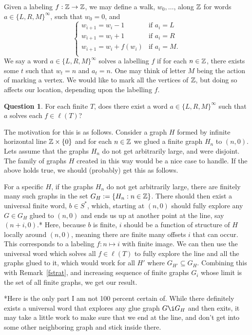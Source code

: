 \documentclass[a4paper]{article}
\theoremstyle{definition}
\newtheorem*{que}{Question}
\begin{document}
Given a labeling $f: \Bbb{Z}\to \Bbb{Z}$, we may define a walk, $w_0,\dots $, along $\Bbb{Z}$ for words $a \in \{L,R,M\}^\infty$, such that $w_0 =0$, and \[\begin{cases}w_{i+1} = w_i -1& \text{if } a_i = L\\ w_{i+1} = w_i +1& \text{if } a_i = R\\w_{i+1} = w_i +f(w_i)& \text{if } a_i = M.\\\end{cases}\]We say a word $a \in \{L,R,M\}^\infty$ solves a labelling $f$ if for each $n \in \Bbb{Z}$, there exists some $t$ such that $w_t = n$ and $a_t = n$. One may think of letter $M$ being the action of marking a vertex. We would like to mark all the vertices of $\Bbb{Z}$, but doing so affects our location, depending upon the labelling $f$.

\begin{que}
    For each finite $T$, does there exist a word $a \in \{L,R,M\}^\infty$ such that $a$ solves each $f \in \ell(T)$?
\end{que}

The motivation for this is as follows. Consider a graph $H$ formed by infinite horizontal line $\Bbb{Z}\times \{0\}$ and for each $n\in \Bbb{Z}$ we glued a finite graph $H_n$ to $(n,0)$. Lets assume that the graphs $H_n$ do not get arbitrarily large, and were disjoint. The family of graphs $H$ created in this way would be a nice case to handle. If the above holds true, we should (probably) get this as follows. 

For a specific $H$, if the graphs $H_n$ do not get arbitrarily large, there are finitely many such graphs in the set $G_H :=\{H_n:n \in \Bbb{Z}\}$. There should then exist a universal finite word, $b \in S^*$, which, starting at $(n,0)$ should fully explore any $G \in G_H$ glued to $(n,0)$ and ends us up at another point at the line, say $(n+i,0)$.* Here, because $b$ is finite, $i$ should be a function of structure of $H$ locally around $(n,0)$, meaning there are finite many offsets $i$ that can occur. This corresponds to a labeling $f:n\mapsto i$ with finite image. We can then use the universal word which solves all $f \in \ell(T)$ to fully explore the line and all the graphs glued to it, which would work for all $H'$ where $G_{H'} \subseteq G_H$. Combining this with Remark~\ref{fstrat}, and increasing sequence of finite graphs $G_i$ whose limit is the set of all finite graphs, we get our result. 

*Here is the only part I am not 100 percent certain of. While there definitely exists a universal word that explores any glue graph $G\i G_H$ and then exits, it may take a little work to make sure that we end at the line, and don't get into some other neighboring graph and stick inside  there.
\end{document}
